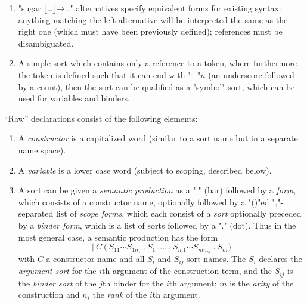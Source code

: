 \documentclass[11pt]{article} %
\begin{document}
\begin{manual}
\begin{enumerate}
  \item "sugar ⟦…⟧→…" alternatives specify equivalent forms for existing syntax: anything matching
    the left alternative will be interpreted the same as the right one (which must have been
    previously defined); references must be disambiguated.

  \item A simple sort which contains only a reference to a token, where furthermore the token is
    defined such that it can end with "_"$n$ (an underscore followed by a count), then the sort can
    be qualified as a "symbol" sort, which can be used for variables and binders.

  \end{enumerate}
\end{manual}
\begin{manual}\label{man:raw}
  ``Raw'' declarations consist of the following elements:
  \begin{enumerate}

  \item A \emph{constructor} is a capitalized word (similar to a sort name but in a separate name
    space).

  \item A \emph{variable} is a lower case word (subject to scoping, described below).

  \item A sort can be given a \emph{semantic production} as a "|" (bar) followed by a \emph{form},
    which consists of a constructor name, optionally followed by a "()"ed ","-separated list of
    \emph{scope forms}, which each consist of a \emph{sort} optionally preceded by a \emph{binder
      form}, which is a list of sorts followed by a "." (dot). Thus in the most general case, a
    semantic production has the form
    \begin{equation*}
      \texttt{|}~C~\texttt{(}
      ~S_{11}\cdots S_{1n_1}~\texttt{.}~S_1~\texttt{,}
      …~\texttt{,}
      ~S_{m1}\cdots S_{mn_m}~\texttt{.}~S_m
      \texttt{)}
    \end{equation*}
    with $C$ a constructor name and all $S_i$ and $S_{ij}$ sort names. The $S_i$ declares the
    \emph{argument sort} for the $i$th argument of the construction term, and the $S_{ij}$ is the
    \emph{binder sort} of the $j$th binder for the $i$th argument; $m$ is the \emph{arity} of the
    construction and $n_i$ the \emph{rank} of the $i$th argument.


\end{enumerate}
\end{manual}
\end{document}

